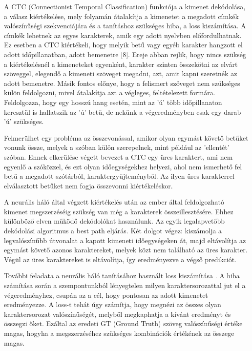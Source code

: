A CTC (Connectionist Temporal Classification) \cite{ctc} funkciója a kimenet dekódolása, a válasz kiértékelése, mely folyamán átalakítja a kimenetet a megadott címkék valószínűségi szekvenciájára és a tanításhoz szükséges hiba, a loss kiszámítása. A címkék lehetnek az egyes karakterek, amik egy adott nyelvben előfordulhatnak. Ez esetben a CTC kiértékeli, hogy melyik betű vagy egyéb karakter hangzott el adott időpillanatban, adott bemenetre [8]. Ereje abban rejlik, hogy nincs szükség a kiértékelésnél a kimeneteket egyenként, karakter szinten összekötni az elvárt szöveggel, elegendő a kimeneti szöveget megadni, azt, amit kapni szeretnék az adott bemenetre. Másik fontos előnye, hogy a felismert szöveget nem szükséges külön feldolgozni, mivel átalakítja azt a végleges, feltételezett formára. Feldolgozza, hogy egy hosszú hang esetén, mint az ’ú’ több időpillanaton keresztül is hallatszik az ’ú’ betű, de nekünk a végeredményben csak egy darab ’ú’ szükséges.

Felmerülhet egy probléma az összevonással, amikor olyan egymást követő betűket vonunk össze, melyek a szóban külön szerepelnek, mint például az ’ellentét’ szóban. Ennek elkerülése végett bevezet a CTC egy üres karaktert, ami nem egyenlő a szóközzel, és ezt olyan időegységekhez helyezi, ahol nem ismerhető fel betű a megadott szótárból, karaktergyűjteményből. Az ilyen üres karakterrel elválasztott betűket nem fogja összevonni kiértékeléskor.

A neurális háló által végzett kiértékelés után az ember által feldolgozható kimenet megszerzéséig szükség van még a karakterek összeillesztésére. Ehhez különböző elven működő dekódolókat használunk. Az egyik legalapvetőbb dekódolási algoritmus a best path eljárás. Két dolgot végez: kiszámolja a legvalószínűbb útvonalat a kapott kimeneti időegységeken át, majd eltávolítja az egymást követő azonos karaktereket, melyek közt nem található az üres karakter. Végül az üres karaktereket is eltávolítja, így eredményezve a végső predikciót.

További feladata a neurális háló tanításához használt loss kiszámítása \cite{ctc_sid}. A hiba számítása során a szempontunkból lényegtelen milyen karaktersorozattal jut el a végeredményhez, csupán az a cél, hogy pontosan az adott kimenetet eredményezze. A loss-t tehát úgy számítja, hogy megnézi az összes olyan karaktersorozat valószínűségét, melyből megkaphatja a kívánt eredményt és összegzi őket. Ezáltal az eredeti GT (Ground Truth) szöveg valószínűségi értéke magas, hogyha a megszerzéséhez szükséges kombinációk értékének az összege magas.


